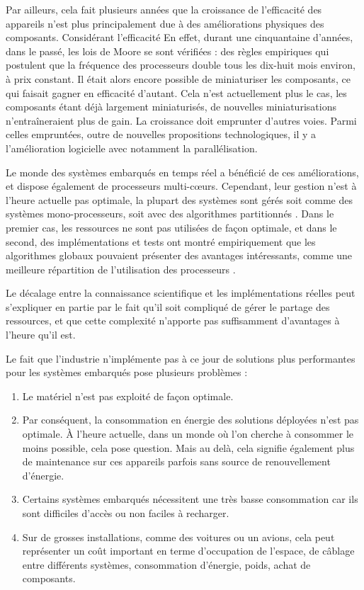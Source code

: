 \documentclass[11pt,a4paper,oneside]{report}
\begin{document}
	Par ailleurs, cela fait plusieurs années que la croissance de l'efficacité des appareils n'est plus 
	principalement due à des améliorations physiques des composants. 
	Considérant l'efficacité 
	En effet, durant une cinquantaine d'années, dans le passé, les lois de Moore
	se sont vérifiées : des règles empiriques qui postulent que la fréquence des processeurs 
	double tous les dix-huit mois environ, à prix constant. 
	Il était alors encore possible de miniaturiser les composants, 
	ce qui faisait gagner en efficacité d'autant. 
	Cela n'est actuellement plus le cas, 
	les composants étant déjà largement miniaturisés, de nouvelles miniaturisations 
	n'entraîneraient plus de gain. La croissance doit emprunter d'autres voies. Parmi celles 
	empruntées, outre de nouvelles propositions technologiques, 
	il y a l'amélioration logicielle avec notamment la parallélisation.
	\medskip
	
	Le monde des systèmes embarqués en temps réel a bénéficié de ces améliorations, 
	et dispose également de processeurs multi-c\oe{}urs. Cependant, leur gestion n'est 
	à l'heure actuelle pas optimale, la plupart des systèmes sont  
	gérés soit comme des systèmes mono-processeurs, soit avec des algorithmes partitionnés \cite{paolillo_new_nodate}. 
	Dans le premier cas, les ressources ne sont pas utilisées de façon optimale, 
	et dans le second, des implémentations et tests ont montré empiriquement 
	que les algorithmes globaux pouvaient présenter des avantages intéressants, comme 
	une meilleure répartition de l'utilisation des processeurs \cite{baker_analysis_2005}. 
	\medskip
	
	Le décalage entre la connaissance scientifique et les implémentations réelles 
	peut s'expliquer en partie par le fait qu'il soit compliqué de gérer le partage des ressources, 
	et que cette complexité n'apporte pas suffisamment d'avantages à l'heure qu'il est.\medskip
	
	Le fait que l'industrie n'implémente pas à ce jour de solutions plus \og performantes \fg{} 
	pour les systèmes embarqués pose plusieurs problèmes :
	\begin{enumerate}
		\item Le matériel n'est pas exploité de façon optimale.
		\item Par conséquent, la consommation en énergie des solutions déployées n'est 
		pas optimale.
		À l'heure actuelle, dans un monde où l'on cherche à consommer le moins possible, 
		cela pose question. Mais au delà, cela signifie également plus de maintenance 
		sur ces appareils parfois sans source de renouvellement d'énergie.
		\item Certains systèmes embarqués nécessitent une très basse consommation car 
		ils sont difficiles d'accès ou non faciles à recharger.
		\item Sur de grosses installations, comme des voitures ou un avions, cela peut représenter 
		un coût important en terme d'occupation de l'espace, de câblage entre différents systèmes, 
		consommation d'énergie, poids, achat de composants.
	\end{enumerate}
	
\end{document}
